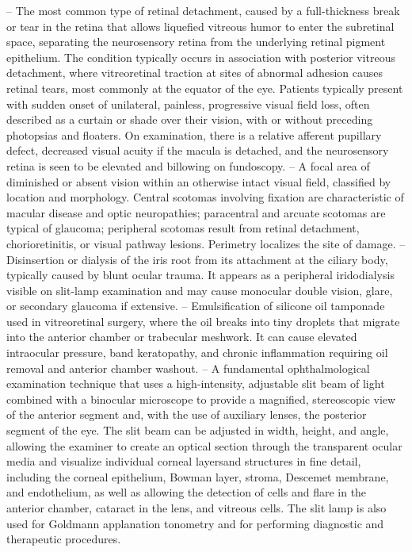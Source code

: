 -- The most common type of retinal detachment, caused by a full-thickness break or tear in the retina that allows liquefied vitreous humor to enter the subretinal space, separating the neurosensory retina from the underlying retinal pigment epithelium. The condition typically occurs in association with posterior vitreous detachment, where vitreoretinal traction at sites of abnormal adhesion causes retinal tears, most commonly at the equator of the eye. Patients typically present with sudden onset of unilateral, painless, progressive visual field loss, often described as a curtain or shade over their vision, with or without preceding photopsias and floaters. On examination, there is a relative afferent pupillary defect, decreased visual acuity if the macula is detached, and the neurosensory retina is seen to be elevated and billowing on fundoscopy.
-- A focal area of diminished or absent vision within an otherwise intact visual field, classified by location and morphology. Central scotomas involving fixation are characteristic of macular disease and optic neuropathies; paracentral and arcuate scotomas are typical of glaucoma; peripheral scotomas result from retinal detachment, chorioretinitis, or visual pathway lesions. Perimetry localizes the site of damage.
-- Disinsertion or dialysis of the iris root from its attachment at the ciliary body, typically caused by blunt ocular trauma. It appears as a peripheral iridodialysis visible on slit-lamp examination and may cause monocular double vision, glare, or secondary glaucoma if extensive.
-- Emulsification of silicone oil tamponade used in vitreoretinal surgery, where the oil breaks into tiny droplets that migrate into the anterior chamber or trabecular meshwork. It can cause elevated intraocular pressure, band keratopathy, and chronic inflammation requiring oil removal and anterior chamber washout.
-- A fundamental ophthalmological examination technique that uses a high-intensity, adjustable slit beam of light combined with a binocular microscope to provide a magnified, stereoscopic view of the anterior segment and, with the use of auxiliary lenses, the posterior segment of the eye. The slit beam can be adjusted in width, height, and angle, allowing the examiner to create an optical section through the transparent ocular media and visualize individual corneal layersand structures in fine detail, including the corneal epithelium, Bowman layer, stroma, Descemet membrane, and endothelium, as well as allowing the detection of cells and flare in the anterior chamber, cataract in the lens, and vitreous cells. The slit lamp is also used for Goldmann applanation tonometry and for performing diagnostic and therapeutic procedures.
